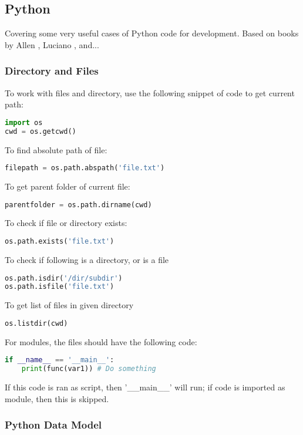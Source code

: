 \subsection{Python}

Covering some very useful cases of Python code for development. Based on books by Allen \cite{downey_2016}, Luciano \cite{ramalho_2016}, and...

\subsubsection{Directory and Files}

To work with files and directory, use the following snippet of code to get current path:
\begin{lstlisting}[language=Python]
import os
cwd = os.getcwd()
\end{lstlisting}
To find absolute path of file:
\begin{lstlisting}[language=Python]
filepath = os.path.abspath('file.txt')
\end{lstlisting}
To get parent folder of current file:
\begin{lstlisting}[language=Python]
parentfolder = os.path.dirname(cwd)
\end{lstlisting}
To check if file or directory exists:
\begin{lstlisting}[language=Python]
os.path.exists('file.txt')
\end{lstlisting}
To check if following is a directory, or is a file
\begin{lstlisting}[language=Python]
os.path.isdir('/dir/subdir')
os.path.isfile('file.txt')
\end{lstlisting}
To get list of files in given directory
\begin{lstlisting}[language=Python]
os.listdir(cwd)
\end{lstlisting}

For modules, the files should have the following code:
\begin{lstlisting}[language=Python]
if __name__ == '__main__':
	print(func(var1)) # Do something
\end{lstlisting}
If this code is ran as script, then '\_\_main\_\_' will run; if code is imported as module, then this is skipped.

\subsubsection{Python Data Model}

